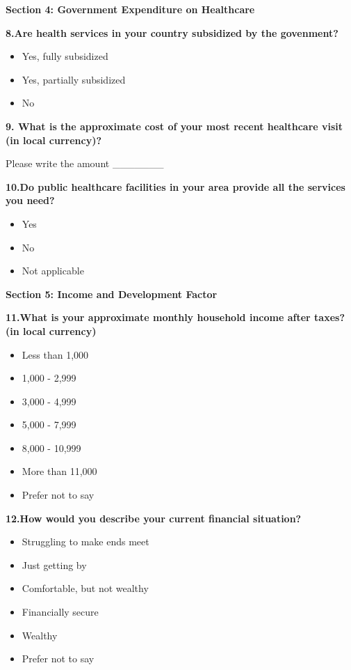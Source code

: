 \documentclass[
  letterpaper,
  DIV=11,
  numbers=noendperiod]{scrartcl}
\providecommand{\tightlist}{%
  \setlength{\itemsep}{0pt}\setlength{\parskip}{0pt}}\usepackage{longtable,booktabs,array}
\begin{document}
\textbf{Section 4: Government Expenditure on Healthcare}

\textbf{8.Are health services in your country subsidized by the
govenment?}

\begin{itemize}
\tightlist
\item
  Yes, fully subsidized
\item
  Yes, partially subsidized
\item
  No
\end{itemize}

\textbf{9. What is the approximate cost of your most recent healthcare
visit (in local currency)?}

Please write the amount \_\_\_\_\_\_\_

\textbf{10.Do public healthcare facilities in your area provide all the
services you need?}

\begin{itemize}
\tightlist
\item
  Yes
\item
  No
\item
  Not applicable
\end{itemize}

\textbf{Section 5: Income and Development Factor}

\textbf{11.What is your approximate monthly household income after
taxes?(in local currency)}

\begin{itemize}
\tightlist
\item
  Less than 1,000
\item
  1,000 - 2,999
\item
  3,000 - 4,999
\item
  5,000 - 7,999
\item
  8,000 - 10,999
\item
  More than 11,000
\item
  Prefer not to say
\end{itemize}

\textbf{12.How would you describe your current financial situation?}

\begin{itemize}
\tightlist
\item
  Struggling to make ends meet
\item
  Just getting by
\item
  Comfortable, but not wealthy
\item
  Financially secure
\item
  Wealthy
\item
  Prefer not to say
\end{itemize}
\end{document}

